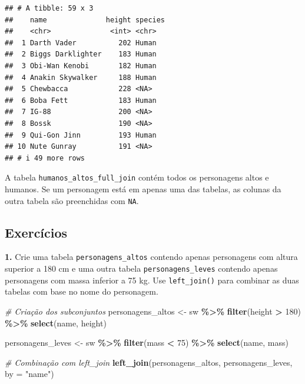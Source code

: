 \documentclass[
]{book}
\newenvironment{Shaded}{\begin{snugshade}}{\end{snugshade}}
\newcommand{\AttributeTok}[1]{\textcolor[rgb]{0.13,0.29,0.53}{#1}}
\newcommand{\CommentTok}[1]{\textcolor[rgb]{0.56,0.35,0.01}{\textit{#1}}}
\newcommand{\DecValTok}[1]{\textcolor[rgb]{0.00,0.00,0.81}{#1}}
\newcommand{\FunctionTok}[1]{\textcolor[rgb]{0.13,0.29,0.53}{\textbf{#1}}}
\newcommand{\NormalTok}[1]{#1}
\newcommand{\OtherTok}[1]{\textcolor[rgb]{0.56,0.35,0.01}{#1}}
\newcommand{\SpecialCharTok}[1]{\textcolor[rgb]{0.81,0.36,0.00}{\textbf{#1}}}
\newcommand{\StringTok}[1]{\textcolor[rgb]{0.31,0.60,0.02}{#1}}
\begin{document}
\begin{verbatim}
## # A tibble: 59 x 3
##    name              height species
##    <chr>              <int> <chr>  
##  1 Darth Vader          202 Human  
##  2 Biggs Darklighter    183 Human  
##  3 Obi-Wan Kenobi       182 Human  
##  4 Anakin Skywalker     188 Human  
##  5 Chewbacca            228 <NA>   
##  6 Boba Fett            183 Human  
##  7 IG-88                200 <NA>   
##  8 Bossk                190 <NA>   
##  9 Qui-Gon Jinn         193 Human  
## 10 Nute Gunray          191 <NA>   
## # i 49 more rows
\end{verbatim}

A tabela \texttt{humanos\_altos\_full\_join} contém todos os personagens altos e
humanos. Se um personagem está em apenas uma das tabelas, as colunas da
outra tabela são preenchidas com \texttt{NA}.

\subsection{Exercícios}\label{exercuxedcios-18}

\textbf{1.} Crie uma tabela \texttt{personagens\_altos} contendo apenas personagens
com altura superior a 180 cm e uma outra tabela \texttt{personagens\_leves}
contendo apenas personagens com massa inferior a 75 kg. Use
\texttt{left\_join()} para combinar as duas tabelas com base no nome do
personagem.

\begin{Shaded}
\begin{Highlighting}[]
\CommentTok{\# Criação dos subconjuntos}
\NormalTok{personagens\_altos }\OtherTok{\textless{}{-}}\NormalTok{ sw }\SpecialCharTok{\%\textgreater{}\%} 
  \FunctionTok{filter}\NormalTok{(height }\SpecialCharTok{\textgreater{}} \DecValTok{180}\NormalTok{) }\SpecialCharTok{\%\textgreater{}\%} 
  \FunctionTok{select}\NormalTok{(name, height)}

\NormalTok{personagens\_leves }\OtherTok{\textless{}{-}}\NormalTok{ sw }\SpecialCharTok{\%\textgreater{}\%} 
  \FunctionTok{filter}\NormalTok{(mass }\SpecialCharTok{\textless{}} \DecValTok{75}\NormalTok{) }\SpecialCharTok{\%\textgreater{}\%} 
  \FunctionTok{select}\NormalTok{(name, mass)}

\CommentTok{\# Combinação com left\_join}
\FunctionTok{left\_join}\NormalTok{(personagens\_altos, personagens\_leves, }\AttributeTok{by =} \StringTok{"name"}\NormalTok{)}
\end{Highlighting}
\end{Shaded}
\end{document}
